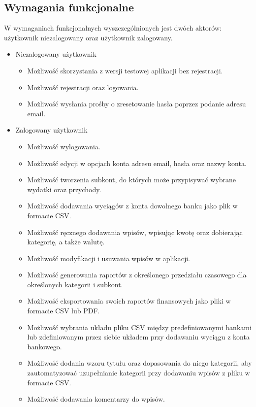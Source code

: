 \documentclass{article}
\begin{document}
	\subsection{Wymagania funkcjonalne}
	W wymaganiach funkcjonalnych wyszczególnionych jest dwóch aktorów: użytkownik niezalogowany oraz użytkownik zalogowany.
	\begin{itemize}
		\item Niezalogowany użytkownik
			\begin{itemize}
				\item Możliwość skorzystania z wersji testowej aplikacji bez rejestracji.
				\item Możliwość rejestracji oraz logowania.
				\item Możliwość wysłania prośby o zresetowanie hasła poprzez podanie adresu email.
			\end{itemize}
		
		\item Zalogowany użytkownik
			\begin{itemize}
				\item Możliwość wylogowania.
				\item Możliwość edycji w opcjach konta adresu email, hasła oraz nazwy konta.
				\item Możliwość tworzenia subkont, do których może przypisywać wybrane wydatki oraz przychody.
				\item Możliwość dodawania wyciągów z konta dowolnego banku jako plik w formacie CSV.
				\item Możliwość ręcznego dodawania wpisów, wpisując kwotę oraz dobierając kategorię, a także walutę.
				\item Możliwość modyfikacji i usuwania wpisów w aplikacji.
				\item Możliwość generowania raportów z określonego przedziału czasowego dla określonych kategorii i subkont.
				\item Możliwość eksportowania swoich raportów finansowych jako pliki w formacie CSV lub PDF.
				\item Możliwość wybrania układu pliku CSV między predefiniowanymi bankami lub zdefiniowanym przez siebie układem przy dodawaniu wyciągu z konta bankowego.
				\item Możliwość dodania wzoru tytułu oraz dopasowania do niego kategorii, aby zautomatyzować uzupełnianie kategorii przy dodawaniu wpisów z pliku w formacie CSV.
				\item Możliwość dodawania komentarzy do wpisów.
			\end{itemize}
	\end{itemize}
\end{document}
